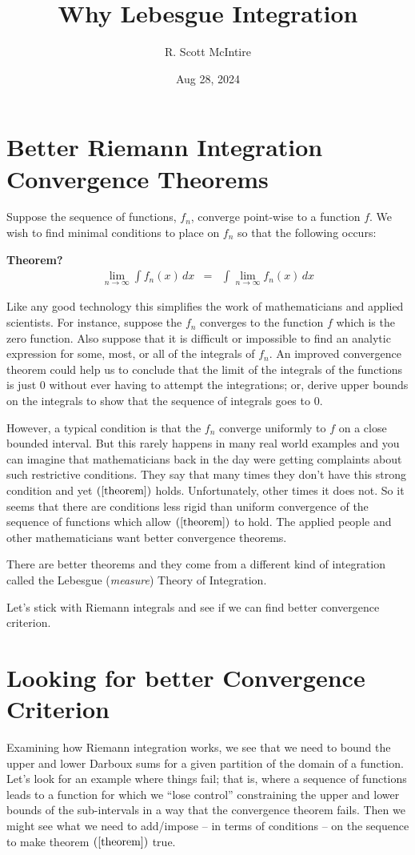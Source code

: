 \documentclass{article}
\title{Why Lebesgue Integration}
\author{R. Scott McIntire}
\date{Aug 28, 2024}
\begin{document}
\maketitle


\section{Better Riemann Integration Convergence Theorems}
Suppose the sequence of functions, $f_n$, converge point-wise to a function $f$.
We wish to find minimal conditions to place on $f_n$ so that the following occurs:

{\bf Theorem?}
\begin{eqnarray}
	\lim_{n \rightarrow \infty}\limits \int f_n(x) \, dx & = & \int \lim_{n \rightarrow \infty}\limits f_n(x) \, dx \label{theorem}
\end{eqnarray}

Like any good technology this simplifies the work of mathematicians 
and applied scientists. For instance, suppose the $f_n$ converges to the function $f$ 
which is the zero function. Also suppose that it is difficult or impossible to 
find an analytic expression for some, most, or all of the integrals of $f_n$. 
An improved convergence theorem could help us to conclude that the limit of the integrals of 
the functions is just $0$ without ever having to attempt the integrations; or, 
derive upper bounds on the integrals to show that 
the sequence of integrals goes to $0$.

However, a typical condition is that the $f_n$ converge 
uniformly to $f$ on a close bounded interval. 
But this rarely happens in many real world examples and you can imagine that
mathematicians back in the day
were getting complaints about such restrictive 
conditions. They say that many times they don't have this strong condition and yet $(\ref{theorem})$
holds. Unfortunately, other times it does not. So it seems that there are 
conditions less rigid than uniform convergence of the sequence of 
functions which allow $(\ref{theorem})$ to hold.
The applied people and other mathematicians want better convergence theorems.

There are better theorems and they come from a different kind of integration called 
the Lebesgue ({\em measure\/}) Theory of Integration.

Let's stick with Riemann integrals and see if we can find better convergence 
criterion.

\section{Looking for better Convergence Criterion}
Examining how Riemann integration works, we see that we need to bound the upper 
and lower Darboux sums for a given partition of the domain of a function. 
Let's look for an example where things fail; that is, where 
a sequence of functions leads to a function for which we ``lose control'' 
constraining the upper and lower bounds of the sub-intervals in a way that the 
convergence theorem fails. Then we might see what we need to add/impose 
-- in terms of conditions -- on the sequence to make theorem 
$(\ref{theorem})$ true.
\end{document}
